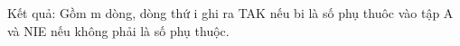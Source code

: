 Kết quả:  
Gồm m dòng, dòng thứ i ghi ra TAK nếu bi là số phụ thuôc vào tập A và NIE nếu không phải là số phụ thuộc.